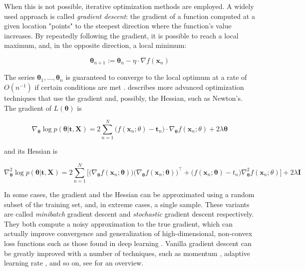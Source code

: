 \documentclass[a4paper]{book}
\begin{document}
When this is not possible, iterative optimization methods are employed. A widely used approach is called \emph{gradient descent}: the gradient of a function computed at a given location "points" to the steepest direction where the function's value increases. By repeatedly following the gradient, it is possible to reach a local maximum, and, in the opposite direction, a local minimum:

\begin{equation}
\bm\theta_{n+1}:=\bm\theta_n-\eta\cdot\nabla f(\bm x_n)
\end{equation}

The series $\bm\theta_1,\ldots,\bm\theta_n$ is guaranteed to converge to the local optimum at a rate of $O(n^{-1})$ if certain conditions are met \citep{gd_convergence}. \cite{numopt} describes more advanced optimization techniques that use the gradient and, possibly, the Hessian, such as Newton's. The gradient of $L(\bm\theta)$ is

\begin{equation}
\label{eq:least_squares_gradient}
\nabla_{\bm\theta}\log p(\bm\theta\vert\bm t,\bm X)
=2\sum_{n=1}^N \big(f(\bm x_n;\theta)-\bm t_n\big)\cdot\nabla_{\bm\theta}f(\bm x_n;\theta) + 2\lambda\bm\theta
\end{equation}

\noindent and its Hessian is

\begin{equation}
\label{eq:least_squares_hessian}
\nabla^2_{\bm\theta}\log p(\bm\theta\vert\bm t,\bm X)=2\sum_{n=1}^{N}\bigg[
\big(\nabla_{\bm\theta} f(\bm x_n;\bm\theta)\big)
\big(\nabla_{\bm\theta} f(\bm x_n;\bm\theta)\big)^\intercal
+\big(f(\bm x_n;\bm\theta)-t_n\big)\nabla^2_{\bm\theta}f(\bm x_n;\theta)\bigg]+2\lambda\bm I
\end{equation}

In some cases, the gradient and the Hessian can be approximated using a random subset of the training set, and, in extreme cases, a single sample. These variants are called \emph{minibatch} gradient descent and \emph{stochastic} gradient descent respectively. They both compute a noisy approximation to the true gradient, which can actually improve convergence and generalization of high-dimensional, non-convex loss functions such as those found in deep learning \citep{sgd_noise, bayesian_sgd}. Vanilla gradient descent can be greatly improved with a number of techniques, such as momentum \citep{gd_momentum}, adaptive learning rate \citep{adagrad, adadelta, adam}, and so on, see \cite{gd_overview} for an overview. 
\end{document}
